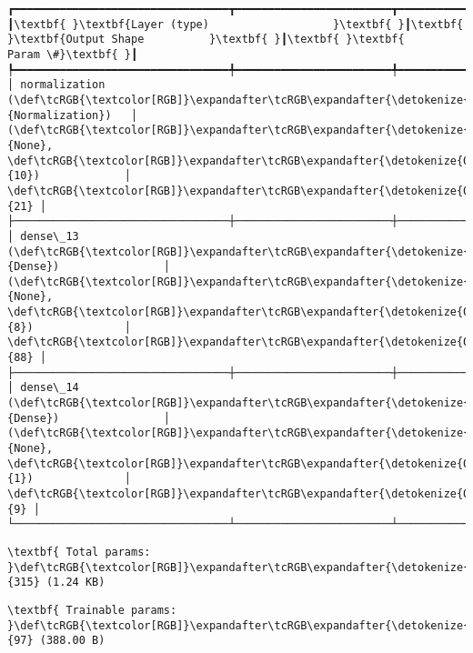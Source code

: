 \documentclass[11pt]{article}
\begin{document}
    \begin{Verbatim}[commandchars=\\\{\}]
┏━━━━━━━━━━━━━━━━━━━━━━━━━━━━━━━━━┳━━━━━━━━━━━━━━━━━━━━━━━━┳━━━━━━━━━━━━━━━┓
┃\textbf{ }\textbf{Layer (type)                   }\textbf{ }┃\textbf{ }\textbf{Output Shape          }\textbf{ }┃\textbf{ }\textbf{      Param \#}\textbf{ }┃
┡━━━━━━━━━━━━━━━━━━━━━━━━━━━━━━━━━╇━━━━━━━━━━━━━━━━━━━━━━━━╇━━━━━━━━━━━━━━━┩
│ normalization (\def\tcRGB{\textcolor[RGB]}\expandafter\tcRGB\expandafter{\detokenize{0,135,255}}{Normalization})   │ (\def\tcRGB{\textcolor[RGB]}\expandafter\tcRGB\expandafter{\detokenize{0,215,255}}{None}, \def\tcRGB{\textcolor[RGB]}\expandafter\tcRGB\expandafter{\detokenize{0,175,0}}{10})             │            \def\tcRGB{\textcolor[RGB]}\expandafter\tcRGB\expandafter{\detokenize{0,175,0}}{21} │
├─────────────────────────────────┼────────────────────────┼───────────────┤
│ dense\_13 (\def\tcRGB{\textcolor[RGB]}\expandafter\tcRGB\expandafter{\detokenize{0,135,255}}{Dense})                │ (\def\tcRGB{\textcolor[RGB]}\expandafter\tcRGB\expandafter{\detokenize{0,215,255}}{None}, \def\tcRGB{\textcolor[RGB]}\expandafter\tcRGB\expandafter{\detokenize{0,175,0}}{8})              │            \def\tcRGB{\textcolor[RGB]}\expandafter\tcRGB\expandafter{\detokenize{0,175,0}}{88} │
├─────────────────────────────────┼────────────────────────┼───────────────┤
│ dense\_14 (\def\tcRGB{\textcolor[RGB]}\expandafter\tcRGB\expandafter{\detokenize{0,135,255}}{Dense})                │ (\def\tcRGB{\textcolor[RGB]}\expandafter\tcRGB\expandafter{\detokenize{0,215,255}}{None}, \def\tcRGB{\textcolor[RGB]}\expandafter\tcRGB\expandafter{\detokenize{0,175,0}}{1})              │             \def\tcRGB{\textcolor[RGB]}\expandafter\tcRGB\expandafter{\detokenize{0,175,0}}{9} │
└─────────────────────────────────┴────────────────────────┴───────────────┘

    \end{Verbatim}

    
    
    \begin{Verbatim}[commandchars=\\\{\}]
\textbf{ Total params: }\def\tcRGB{\textcolor[RGB]}\expandafter\tcRGB\expandafter{\detokenize{0,175,0}}{315} (1.24 KB)

    \end{Verbatim}

    
    
    \begin{Verbatim}[commandchars=\\\{\}]
\textbf{ Trainable params: }\def\tcRGB{\textcolor[RGB]}\expandafter\tcRGB\expandafter{\detokenize{0,175,0}}{97} (388.00 B)

    \end{Verbatim}
\end{document}

